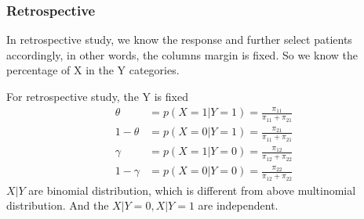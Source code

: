 	\subsubsection{Retrospective}
	In retrospective study, we know the response and further select patients accordingly, in other words, the columns margin is fixed. So we know the percentage of X in the Y categories. 
	
	For retrospective study, the Y is fixed
	\begin{align*}
		\theta &= p(X=1|Y=1) = \frac{\pi_{11}}{\pi_{11} + \pi_{21}}\\
		1- \theta &= p(X=0|Y=1) = \frac{\pi_{21}}{\pi_{11} + \pi_{21}}\\
		\gamma &= p(X=1|Y=0) = \frac{\pi_{12}}{\pi_{12} + \pi_{22}}\\
		1- \gamma &= p(X=0|Y=0) = \frac{\pi_{22}}{\pi_{12} + \pi_{22}}
	\end{align*} 
	$X|Y$ are binomial distribution, which is different from above multinomial distribution. And the $X|Y=0, X|Y=1$ are independent. 
	
